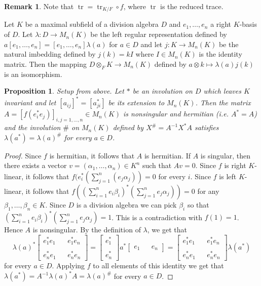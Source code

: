\documentclass[12pt,reqno]{amsart}
\newtheorem{prop}[thm]{Proposition}
\theoremstyle{definition}
\newtheorem*{rem}{Remark}
\DeclareMathOperator{\tr}{tr}
\begin{document}
\begin{rem}
Note that $\tr = \tr_{K/F} \circ f$, where $\tr$ is the reduced trace. 
\end{rem}

Let $K$ be a maximal subfield of a division algebra $D$ and $e_1,\ldots,e_n$ a right $K$-basis of $D$.
Let $\lambda \colon D \to M_n(K)$ be the left regular representation defined by 
$a [e_1,\ldots,e_n] = [e_1,\ldots,e_n] \lambda(a)$ for $a \in D$ and let $j \colon K \to M_n(K)$
be the natural imbedding defined by $j(k)=kI$ where $I \in M_n(K)$ is the identity matrix.
Then the mapping $D \otimes_F K \to M_n(K)$ defined by $a \otimes k \mapsto \lambda(a)j(k)$
is an isomorphism.

\begin{prop}
\label{extend}
Setup from above. Let $\ast$ be an involution on $D$ which leaves $K$ invariant
and let $[a_{ij}]^\ast =[a_{ji}^\ast]$ be its extension to $M_n(K)$. Then the matrix 
$A = [f(e_i^\ast e_j)]_{i,j=1,\ldots,n} \in M_n(K)$ is nonsingular and hermitian (i.e. $A^\ast=A$) 
and the involution $\#$ on $M_n(K)$ defined by $X^\# = A^{-1}X^\ast A$ satisfies 
$\lambda(a^\ast)=\lambda(a)^\#$ for every $a \in D$.     
\end{prop} 

\begin{proof}
Since $f$ is hermitian, it follows that $A$ is hermitian. If $A$ is singular, then there exists a vector 
$v = (\alpha_1,\ldots,\alpha_n) \in K^n$ such that $Av=0$. Since $f$ is right $K$-linear, it follows that
$f(e_i^\ast (\sum_{j=1}^n(e_j \alpha_j))=0$ for every $i$. Since $f$ is left $K$-linear, it follows that
$f((\sum_{i=1}^n e_i \beta_i)^\ast (\sum_{j=1}^n e_j \alpha_j))=0$ for any $\beta_1,\ldots,\beta_n \in K$.
Since $D$ is a division algebra we can pick $\beta_i$ so that 
$(\sum_{i=1}^n e_i \beta_i)^\ast (\sum_{j=1}^n e_j \alpha_j)=1$. 
This is a contradiction with $f(1)=1$. Hence $A$ is nonsingular.
By the definition of $\lambda$, we get that 
\[
\lambda(a)^\ast 
\left[ \begin{array}{ccc} 
e_1^\ast e_1 & & e_1^\ast e_n\\ 
               & & \\
e_n^\ast e_1 & & e_n^\ast e_n
\end{array} \right] 
=
\left[ \begin{array}{c} e_1^\ast \\ \\ e_n^\ast \end{array} \right]
a^\ast 
\left[ \begin{array}{ccc} e_1 & & e_n \end{array} \right] 
=
\left[ \begin{array}{ccc} 
e_1^\ast e_1 & & e_1^\ast e_n\\ 
               & & \\
e_n^\ast e_1 & & e_n^\ast e_n
\end{array} \right]  
\lambda(a^\ast)
\]
for every $a \in D$. Applying $f$ to all elements of this identity we get
that $\lambda(a^\ast) = A^{-1} \lambda(a)^\ast A = \lambda(a)^\#$
for every $a \in D$.
\end{proof}
\end{document}
